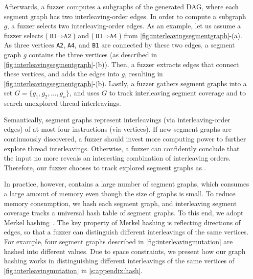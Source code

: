 Afterwards, a fuzzer computes a subgraphs of the generated DAG, where
each segment graph has two interleaving-order edges.
%
In order to compute a subgraph $g$, a fuzzer selects two
interleaving-order edges.
%
As an example, let us assume a fuzzer selects
($\texttt{B1} \Rightarrow \texttt{A2}$) and
($\texttt{B1} \Rightarrow \texttt{A4}$) from
\autoref{fig:interleavingsegmentgraph}-(a).
%
As three vertices \texttt{A2}, \texttt{A4}, and \texttt{B1} are
connected by these two edges, a segment graph $g$ contains the three
vertices (as described in \autoref{fig:interleavingsegmentgraph}-(b)).
%
Then, a fuzzer extracts edges that connect these vertices, and adds
the edges into $g$, resulting in
\autoref{fig:interleavingsegmentgraph}-(b).
%
Lastly, a fuzzer gathers segment graphs into a set
$G = \{g_1, g_2, ..., g_n\}$, and uses $G$ to track interleaving
segment coverage and to search unexplored thread interleavings.





%
%
Semantically, segment graphs represent interleavings (via
interleaving-order edges) of at most four instructions (via vertices).
%
If new segment graphs are continuously discovered, a fuzzer should
invest more computing power to further explore thread interleavings.
Otherwise, a fuzzer can confidently conclude that the input no more
reveals an interesting combination of interleaving orders.
%
Therefore, our fuzzer chooses to track explored segment graphs as
\intcov.


In practice, however, \intcov contains a large number of segment
graphs, which consumes a large amount of memory even though the size
of graphs is small.
%
To reduce memory consumption, we hash each segment graph, and
interleaving segment coverage tracks a universal hash table of segment
graphs.
%
To this end, we adopt Merkel hashing~\cite{treehashing, treehashing2}.
%
The key property of Merkel hashing is reflecting directions of edges,
so that a fuzzer can distinguish different interleavings of the same
vertices. For example, four segment graphs described in
\autoref{fig:interleavingmutation} are hashed into different values.
%
Due to space constraints, we present how our graph hashing works in
distinguishing different interleavings of the same vertices of
\autoref{fig:interleavingmutation} in \autoref{s:appendix:hash}.









